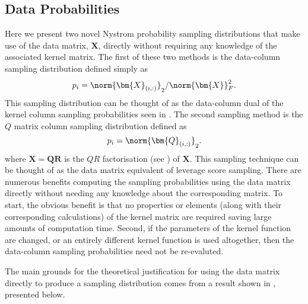 \subsection{Data Probabilities}\label{Section2.3}

Here we present two novel Nystrom probability sampling distributions that make use of the data matrix, $\bm{X}$, directly without requiring any knowledge of the associated kernel matrix. The first of these two methods is the data-column sampling distribution defined simply as
\begin{equation*}
    p_{i} = \norm{\bm{X}_{(i,:)}}_2 / \norm{\bm{X}}_{F}^2.
\end{equation*}
This sampling distribution can be thought of as the data-column dual of the kernel column sampling probabilities seen in . The second sampling method is the $Q$ matrix column sampling distribution defined as
\begin{equation*}
    p_{i} = \norm{\bm{Q}_{(i,:)}}_2.
\end{equation*}
where $\bm{X} = \bm{Q} \bm{R}$ is the $QR$ factorisation (see ) of $\bm{X}$. This sampling technique can be thought of as the data matrix equivalent of leverage score sampling. There are numerous benefits computing the sampling probabilities using the data matrix directly without needing any knowledge about the corresponding matrix. To start, the obvious benefit is that no properties or elements (along with their corresponding calculations) of the kernel matrix are required saving large amounts of computation time. Second, if the parameters of the kernel function are changed, or an entirely different kernel function is used altogether, then the data-column sampling probabilities need not be re-evaluted.

The main grounds for the theoretical justification for using the data matrix directly to produce a sampling distribution comes from a result shown in \cite{KarouiNoureddineEl2010TSOK}, presented below.

\renewcommand{\labelenumi}{(\alph{enumi})}

